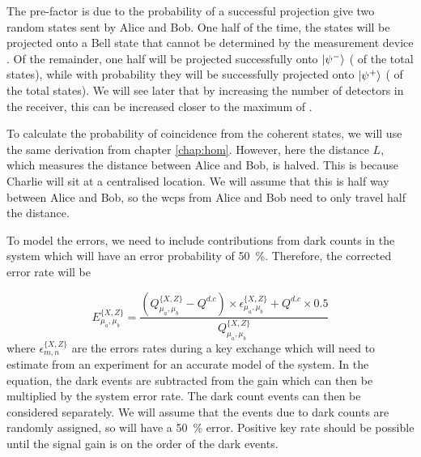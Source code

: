 The  pre-factor is due to the probability of a successful projection give two random states sent by Alice and Bob. One half of the time, the states will be projected onto a Bell state that cannot be determined by the measurement device \cite{walborn2003, Mattle1996}. Of the remainder, one half will be projected successfully onto $\ket{\psi^-}$ ( of the total states), while with probability  they will be successfully projected onto $\ket{\psi^+}$ ( of the total states). We will see later that by increasing the number of detectors in the receiver, this can be increased closer to the maximum of .

To calculate the probability of coincidence from the coherent states, we will use the same derivation from chapter \ref{chap:hom}. However, here the distance $L$, which measures the distance between Alice and Bob, is halved. This is because Charlie will sit at a centralised location. We will assume that this is half way between Alice and Bob, so the \acp{wcp} from Alice and Bob need to only travel half the distance. 


To model the errors, we need to include contributions from dark counts in the system which will have an error probability of \SI{50}{\percent}. Therefore, the corrected error rate will be

\begin{equation}
	E^{\{X,Z\}}_{\mu_a,\mu_b} = \frac{\left(Q^{\{X,Z\}}_{\mu_a,\mu_b} - Q^{d.c}\right) \times \epsilon^{\{X,Z\}}_{\mu_a,\mu_b} + Q^{d.c} \times 0.5}{Q^{\{X,Z\}}_{\mu_a,\mu_b}}
\end{equation}
where $\epsilon^{\{X,Z\}}_{m,n}$ are the errors rates during a key exchange which will need to estimate from an experiment for an accurate model of the system. In the equation, the dark events are subtracted from the gain which can then be multiplied by the system error rate. The dark count events can then be considered separately. We will assume that the events due to dark counts are randomly assigned, so will have a \SI{50}{\percent} error. Positive key rate should be possible until the signal gain is on the order of the dark events.

